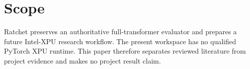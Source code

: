 \section{Scope}
Ratchet preserves an authoritative full-transformer evaluator and prepares a future
Intel-XPU research workflow. The present workspace has no qualified PyTorch XPU runtime.
This paper therefore separates reviewed literature from project evidence and makes no
project result claim.
